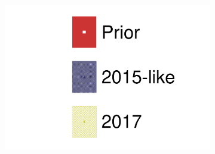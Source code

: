 \begin{figure}[h]
	\begin{subfigure}[t]{0.10\textwidth}
		\includegraphics[width=\textwidth, trim={0mm 0mm 0mm 0mm}, clip,page=1]{figures/mach3/data/alt/2017b_NewData_NewDet_hpc_2015like__2017b_NewData_NewDet_UpdXsecStep_2Xsec_4Det_5Flux_0.pdf}
	\end{subfigure}


\end{figure}
